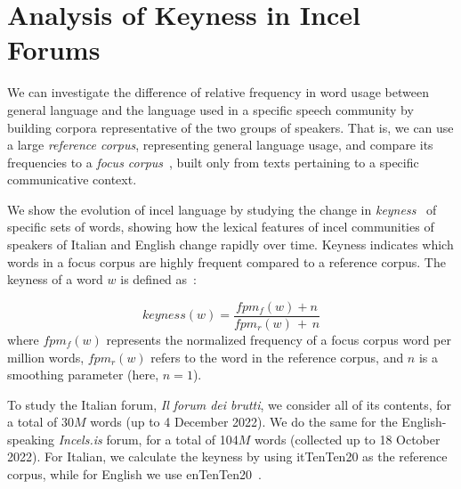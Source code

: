 \documentclass[11pt]{article}
\newcommand{\todoA}[1]{\todo[color=blue!40]{A: #1}}
\begin{document}



\appendix

\section{Analysis of Keyness in Incel Forums}
\label{app:keyness}


We can investigate the difference of relative frequency in word usage between general language and the language used in a specific speech community by building corpora representative of the two groups of speakers. That is, we can use a large \textit{reference corpus},
representing general language usage, and compare its frequencies to a \textit{focus corpus}~\cite{kilgarriff2009simple}, built only from texts pertaining to a specific communicative context.

We show the evolution of incel language by studying the change in
\textit{keyness}~\cite{kilgarriff2009simple}
of specific sets of words, showing how the lexical features of incel
communities of speakers of Italian and English
change rapidly over time.
Keyness indicates which words in a focus corpus are highly frequent compared to a reference corpus.
The keyness of a word $w$ is defined as~\cite{lexical_computing_2015}:%

\begin{equation}
keyness(w) = \frac{fpm_f(w) + n}
                {fpm_r(w)\, + \,n}
\end{equation}
%
where $fpm_f(w)$ represents the normalized frequency of a focus corpus word per million words, $fpm_r(w)$ refers to the word in the reference corpus, and $n$ is a smoothing parameter (here, $n=1$).


To study the Italian forum, \textit{Il forum dei brutti}, we consider all of its contents, for a total of 30$M$ words (up to 4 December 2022).
We do the same for the English-speaking \textit{Incels.is} forum, for a total of 104$M$ words (collected up to 18 October 2022).
For Italian, we calculate the keyness by using itTenTen20
as the reference corpus, while for English we use enTenTen20~\cite{tenten2013kilgarriff}.
\end{document}
